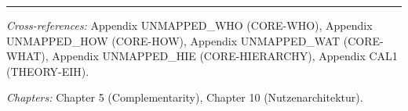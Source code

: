 \vspace{1em}
\hrule
\vspace{0.5em}

\noindent\textit{Cross-references:}
Appendix UNMAPPED_WHO (CORE-WHO),
Appendix UNMAPPED_HOW (CORE-HOW),
Appendix UNMAPPED_WAT (CORE-WHAT),
Appendix UNMAPPED_HIE (CORE-HIERARCHY),
Appendix CAL1 (THEORY-EIH).

\noindent\textit{Chapters:} Chapter 5 (Complementarity), Chapter 10 (Nutzenarchitektur).


